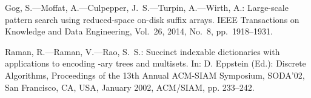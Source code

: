 \documentclass{cai}
\begin{document}
\begin{thebibliography}{99}
Gog, S.---Moffat, A.---Culpepper, J.~S.---Turpin, A.---Wirth, A.: Large-scale pattern search using reduced-space on-disk suffix arrays. IEEE Transactions on
  Knowledge and Data Engineering, Vol.~26, 2014, No.~8, pp.~1918--1931.

Raman, R.---Raman, V.---Rao, S.~S.: Succinct indexable dictionaries with
  applications to encoding -ary trees and multisets. 
  In: D. Eppstein (Ed.):
  Discrete Algorithms,
  Proceedings of the 13th Annual ACM-SIAM Symposium, SODA'02, San Francisco, CA, USA, January 2002,
  ACM/SIAM, pp. 233--242.

\end{thebibliography}



\label{lastpage}
\end{document}
